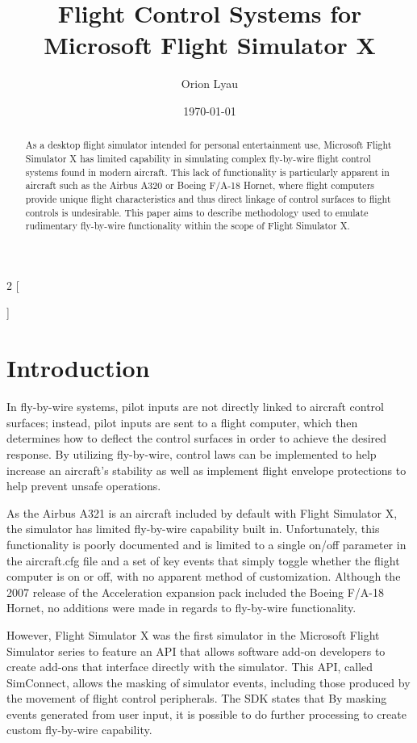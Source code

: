 \documentclass[10pt]{article}
\title{Flight Control Systems for Microsoft Flight Simulator X}
\author{Orion Lyau}
\date{\today}
\begin{document}
\begin{multicols}{2}
[
\maketitle
\begin{abstract}
\noindent As a desktop flight simulator intended for personal entertainment use, Microsoft Flight Simulator X has limited capability in simulating complex fly-by-wire flight control systems found in modern aircraft.  This lack of functionality is particularly apparent in aircraft such as the Airbus A320 or Boeing F/A-18 Hornet, where flight computers provide unique flight characteristics and thus direct linkage of control surfaces to flight controls is undesirable.  This paper aims to describe methodology used to emulate rudimentary fly-by-wire functionality within the scope of Flight Simulator X.
\end{abstract}
]

\section{Introduction}

In fly-by-wire systems, pilot inputs are not directly linked to aircraft control surfaces; instead, pilot inputs are sent to a flight computer, which then determines how to deflect the control surfaces in order to achieve the desired response.  By utilizing fly-by-wire, control laws can be implemented to help increase an aircraft's stability as well as implement flight envelope protections to help prevent unsafe operations.

As the Airbus A321 is an aircraft included by default with Flight Simulator X, the simulator has limited fly-by-wire capability built in.  Unfortunately, this functionality is poorly documented and is limited to a single on/off parameter in the aircraft.cfg file and a set of key events that simply toggle whether the flight computer is on or off, with no apparent method of customization.  Although the 2007 release of the Acceleration expansion pack included the Boeing F/A-18 Hornet, no additions were made in regards to fly-by-wire functionality.

However, Flight Simulator X was the first simulator in the Microsoft Flight Simulator series to feature an API that allows software add-on developers to create add-ons that interface directly with the simulator.  This API, called SimConnect, allows the masking of simulator events, including those produced by the movement of flight control peripherals.  The SDK states that   By masking events generated from user input, it is possible to do further processing to create custom fly-by-wire capability.


\end{multicols}
\end{document}
